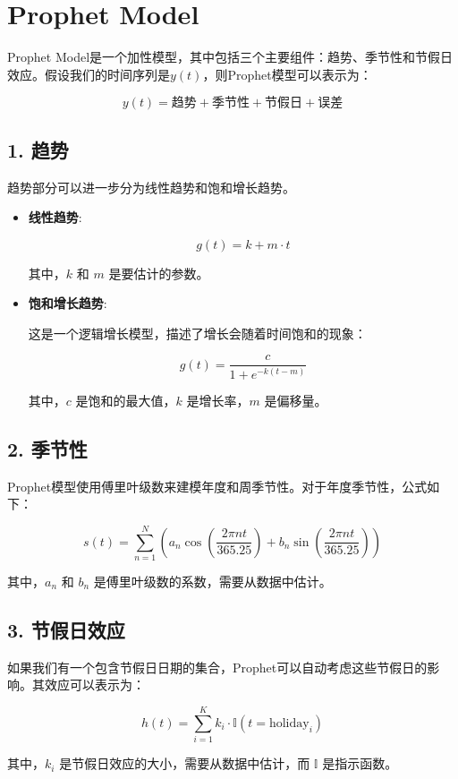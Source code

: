 \documentclass[4pt]{article}
\begin{document}
\section*{Prophet Model}

Prophet Model\cite{Prophet2017}是一个加性模型，其中包括三个主要组件：趋势、季节性和节假日效应。假设我们的时间序列是\( y(t) \)，则Prophet模型可以表示为：

\[ y(t) = \text{趋势} + \text{季节性} + \text{节假日} + \text{误差} \]

\subsection*{1. 趋势}

趋势部分可以进一步分为线性趋势和饱和增长趋势。

\begin{itemize}
    \item \textbf{线性趋势}:

    \[ g(t) = k + m \cdot t \]

    其中，\( k \) 和 \( m \) 是要估计的参数。

    \item \textbf{饱和增长趋势}:

    这是一个逻辑增长模型，描述了增长会随着时间饱和的现象：

    \[ g(t) = \frac{c}{1 + e^{-k(t - m)}} \]

    其中，\( c \) 是饱和的最大值，\( k \) 是增长率，\( m \) 是偏移量。
\end{itemize}

\subsection*{2. 季节性}

Prophet模型使用傅里叶级数来建模年度和周季节性。对于年度季节性，公式如下：

\[ s(t) = \sum_{n=1}^{N} \left( a_n \cos\left(\frac{2\pi nt}{365.25}\right) + b_n \sin\left(\frac{2\pi nt}{365.25}\right) \right) \]

其中，\( a_n \) 和 \( b_n \) 是傅里叶级数的系数，需要从数据中估计。

\subsection*{3. 节假日效应}

如果我们有一个包含节假日日期的集合，Prophet可以自动考虑这些节假日的影响。其效应可以表示为：

\[ h(t) = \sum_{i=1}^{K} k_i \cdot \mathbb{I}(t = \text{holiday}_i) \]

其中，\( k_i \) 是节假日效应的大小，需要从数据中估计，而 \( \mathbb{I} \) 是指示函数。

\end{document}
